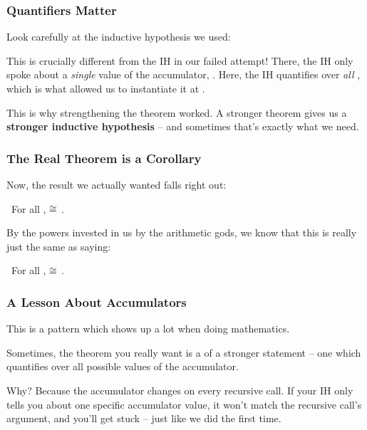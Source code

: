 \documentclass[aspectratio=169]{beamer}
\begin{document}
\begin{frame}[fragile]
  \frametitle{Quantifiers Matter}

  Look carefully at the inductive hypothesis we used:

  \pause
  \vspace{\fill}


  \pause
  \vspace{\fill}

  This is crucially different from the IH in our failed attempt! There, the IH only
  spoke about a \textit{single} value of the accumulator, . Here, the IH
  quantifies over \textit{all} , which is what allowed us to instantiate it
  at .

  \pause
  \vspace{\fill}

  This is why strengthening the theorem worked. A stronger theorem gives us a
  \textbf{stronger inductive hypothesis} -- and sometimes that's exactly what we need.
\end{frame}

\begin{frame}[fragile]
  \frametitle{The Real Theorem is a Corollary}

  Now, the result we actually wanted falls right out:

  \pause
  \vspace{5pt}

  \thmBox{}\, For all ,  $\cong$ .

  \pause
  \vspace{\fill}

  By the powers invested in us by the arithmetic gods, we know that this is really
  just the same as saying:

  \vspace{5pt}

  \thmBox{}\, For all ,  $\cong$ .
\end{frame}

\begin{frame}[fragile]
  \frametitle{A Lesson About Accumulators}

  This is a pattern which shows up a lot when doing mathematics.

  \pause
  \vspace{\fill}

  Sometimes, the theorem you really want is a  of a stronger statement
  -- one which quantifies over all possible values of the accumulator.

  \pause
  \vspace{\fill}

  Why? Because the accumulator changes on every recursive call. If your IH only
  tells you about one specific accumulator value, it won't match the recursive
  call's argument, and you'll get stuck -- just like we did the first time.
\end{frame}

\thankyou
\end{document}
